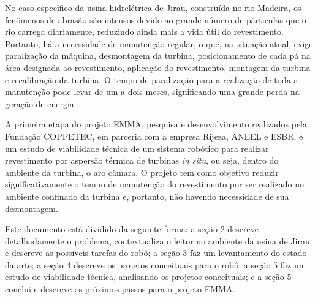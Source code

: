 No caso específico da usina hidrelétrica de Jirau, construída no rio Madeira,
os fenômenos de abrasão são intensos devido ao grande número
de párticulas que o rio carrega diariamente, reduzindo ainda mais a vida útil do revestimento.
Portanto, há a necessidade de manutenção regular, o que, na situação atual,
exige paralização da máquina, desmontagem da turbina, posicionamento de cada pá
na área designada ao revestimento, aplicação do revestimento, montagem da
turbina e recalibração da turbina. O tempo de paralização para a realização de
toda a manutenção pode levar de um a dois meses, significando uma grande perda
na geração de energia.

A primeira etapa do projeto EMMA, pesquisa e desenvolvimento
realizados pela Fundação COPPETEC, em parceria com a empresa Rijeza, ANEEL e
ESBR, é um estudo de viabilidade técnica de um sistema robótico para realizar
revestimento por aspersão térmica de turbinas \textit{in situ}, ou seja, dentro
do ambiente da turbina, o aro câmara. O projeto tem como objetivo reduzir
significativamente o tempo de manutenção do revestimento por ser realizado no
ambiente confinado da turbina e, portanto, não havendo necessidade de sua
desmontagem.

Este documento está dividido da seguinte forma: a seção 2 descreve
detalhadamente o problema, contextualiza o leitor no ambiente da usina de
Jirau e descreve as possíveis tarefas do robô; a seção 3 faz um levantamento do
estado da arte; a seção 4 descreve os projetos conceituais para o robô; a seção
5 faz um estudo de viabilidade técnica, analisando os projetos conceituais; e a
seção 5 conclui e descreve os próximos passos para o projeto EMMA. 
